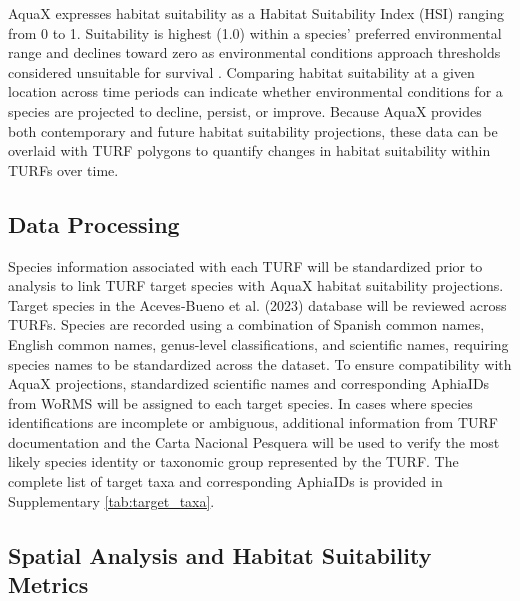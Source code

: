 \documentclass[12pt]{article}
\begin{document}
AquaX expresses habitat suitability as a Habitat Suitability Index (HSI) ranging from 0 to 1. Suitability is highest (1.0) within a species' preferred environmental range and declines toward zero as environmental conditions approach thresholds considered unsuitable for survival \citep{Reygondeau2026}. Comparing habitat suitability at a given location across time periods can indicate whether environmental conditions for a species are projected to decline, persist, or improve. Because AquaX provides both contemporary and future habitat suitability projections, these data can be overlaid with TURF polygons to quantify changes in habitat suitability within TURFs over time.

\subsection{Data Processing}\label{sec:HS}

Species information associated with each TURF will be standardized prior to analysis to link TURF target species with AquaX habitat suitability projections. Target species in the Aceves-Bueno et al. (2023) database will be reviewed across TURFs. Species are recorded using a combination of Spanish common names, English common names, genus-level classifications, and scientific names, requiring species names to be standardized across the dataset. 
To ensure compatibility with AquaX projections, standardized scientific names and corresponding AphiaIDs from WoRMS will be assigned to each target species. In cases where species identifications are incomplete or ambiguous, additional information from TURF documentation and the Carta Nacional Pesquera will be used to verify the most likely species identity or taxonomic group represented by the TURF. The complete list of target taxa and corresponding AphiaIDs is provided in Supplementary \autoref{tab:target_taxa}.

\subsection{Spatial Analysis and Habitat Suitability Metrics}
\end{document}

